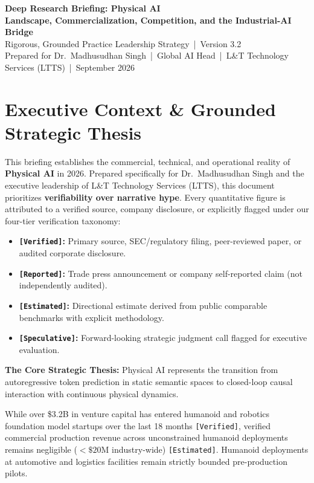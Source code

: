 \documentclass[11pt,a4paper]{article}
\begin{document}
\begin{center}
{\LARGE\bfseries\color{darkprimary} Deep Research Briefing: Physical AI}\\[5pt]
{\large\color{textdark}\textbf{Landscape, Commercialization, Competition, and the Industrial-AI Bridge}}\\[3pt]
{\small\color{textgray} Rigorous, Grounded Practice Leadership Strategy \,|\, Version 3.2}\\[3pt]
{\small\color{textgray} Prepared for Dr.\ Madhusudhan Singh \,|\, Global AI Head \,|\, L\&T Technology Services (LTTS) \,|\, September 2026}
\end{center}

\vspace{0.2cm}

\section*{Executive Context \& Grounded Strategic Thesis}
This briefing establishes the commercial, technical, and operational reality of \textbf{Physical AI} in 2026. Prepared specifically for Dr.\ Madhusudhan Singh and the executive leadership of L\&T Technology Services (LTTS), this document prioritizes \textbf{verifiability over narrative hype}. Every quantitative figure is attributed to a verified source, company disclosure, or explicitly flagged under our four-tier verification taxonomy:
\begin{itemize}
    \item \textbf{\texttt{[Verified]}:} Primary source, SEC/regulatory filing, peer-reviewed paper, or audited corporate disclosure.
    \item \textbf{\texttt{[Reported]}:} Trade press announcement or company self-reported claim (not independently audited).
    \item \textbf{\texttt{[Estimated]}:} Directional estimate derived from public comparable benchmarks with explicit methodology.
    \item \textbf{\texttt{[Speculative]}:} Forward-looking strategic judgment call flagged for executive evaluation.
\end{itemize}

\textbf{The Core Strategic Thesis:}
Physical AI represents the transition from autoregressive token prediction in static semantic spaces to closed-loop causal interaction with continuous physical dynamics. 

While over \$3.2B in venture capital has entered humanoid and robotics foundation model startups over the last 18 months \texttt{[Verified]}, verified commercial production revenue across unconstrained humanoid deployments remains negligible ($<\$20\text{M}$ industry-wide) \texttt{[Estimated]}. Humanoid deployments at automotive and logistics facilities remain strictly bounded pre-production pilots.
\end{document}
